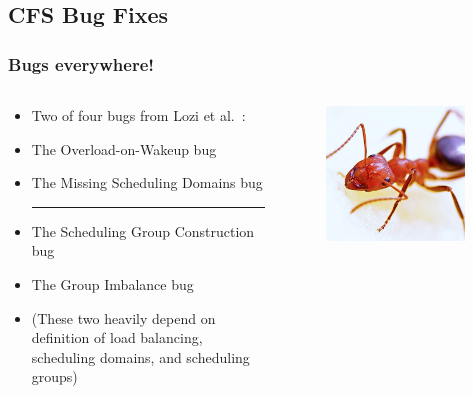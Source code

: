 \documentclass{beamer}
\newcommand{\linespace}{\vskip 0.25cm}
\begin{document}
\subsection{CFS Bug Fixes}
\begin{frame}
\frametitle{Bugs everywhere!}

\begin{columns}
\begin{column}{0.72\textwidth}
\begin{itemize}
	\item[] Two of four bugs from Lozi et al.~\cite{Lozi:2016}:
	\item The Overload-on-Wakeup bug
	\item The Missing Scheduling Domains bug
	
	\linespace	
	\noindent\rule{4cm}{0.4pt}
	\linespace	
	
	\item The Scheduling Group Construction bug
	\item The Group Imbalance bug

	\linespace
	
\item[] (These two heavily depend on definition of load balancing, scheduling domains, and scheduling groups)
	
\end{itemize}
\end{column}
\begin{column}[b]{0.28\textwidth} %
\begin{figure}
\centering
\includegraphics[width=0.95\textwidth]{Illustrations/ant_from_pexels.png}
\end{figure}
\end{column}
\end{columns}

\end{frame}
\end{document}
